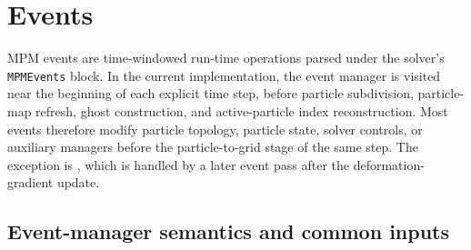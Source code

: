 \section{Events}
\label{sec:events}

MPM events are time-windowed run-time operations parsed under the solver's \texttt{MPMEvents} block.  In the current implementation, the event manager is visited near the beginning of each explicit time step, before particle subdivision, particle-map refresh, ghost construction, and active-particle index reconstruction.  Most events therefore modify particle topology, particle state, solver controls, or auxiliary managers before the particle-to-grid stage of the same step.  The exception is , which is handled by a later event pass after the deformation-gradient update.

\subsection{Event-manager semantics and common inputs}
\label{subsec:event-manager-semantics}

